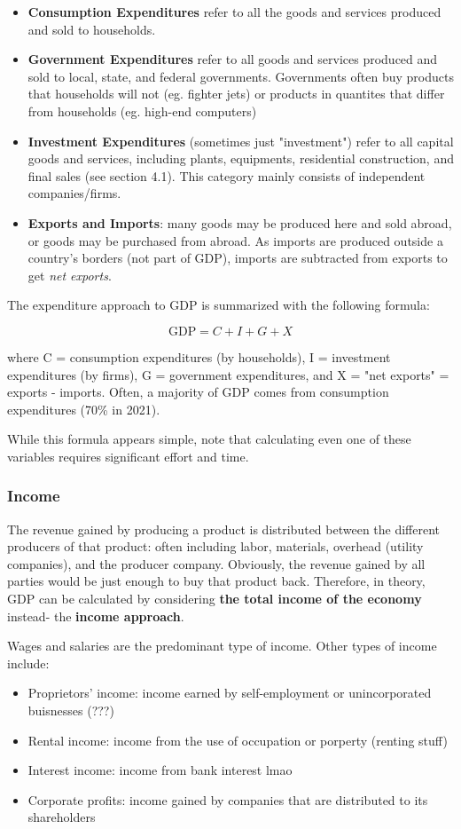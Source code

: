 \documentclass[12pt, a4paper]{article}
\theoremstyle{definition}
\begin{document}
\begin{itemize}
    \item \textbf{Consumption Expenditures} refer to all the goods and services produced and sold to households.
    \item \textbf{Government Expenditures} refer to all goods and services produced and sold to local, state, and federal governments. Governments often buy products that households will not (eg. fighter jets) or products in quantites that differ from households (eg. high-end computers)
    \item \textbf{Investment Expenditures} (sometimes just "investment") refer to all capital goods and services, including plants, equipments, residential construction, and final sales (see section 4.1). This category mainly consists of independent companies/firms.
    \item \textbf{Exports and Imports}: many goods may be produced here and sold abroad, or goods may be purchased from abroad. As imports are produced outside a country's borders (not part of GDP), imports are subtracted from exports to get \textit{net exports}.
\end{itemize}

The expenditure approach to GDP is summarized with the following formula:

\[\textrm{GDP} = C + I + G + X\]

where C = consumption expenditures (by households), I = investment expenditures (by firms), G = government expenditures, and X = "net exports" = exports - imports.
Often, a majority of GDP comes from consumption expenditures (70\% in 2021).

While this formula appears simple, note that calculating even one of these variables requires significant effort and time.

\subsubsection{Income}

The revenue gained by producing a product is distributed between the different producers of that product: often including labor, materials, overhead (utility companies), and the producer company.
Obviously, the revenue gained by all parties would be just enough to buy that product back.
Therefore, in theory, GDP can be calculated by considering \textbf{the total income of the economy} instead- the \textbf{income approach}.

Wages and salaries are the predominant type of income.
Other types of income include:
\begin{itemize}
    \item Proprietors' income: income earned by self-employment or unincorporated buisnesses (???)
    \item Rental income: income from the use of occupation or porperty (renting stuff)
    \item Interest income: income from bank interest lmao
    \item Corporate profits: income gained by companies that are distributed to its shareholders
\end{itemize}
\end{document}
